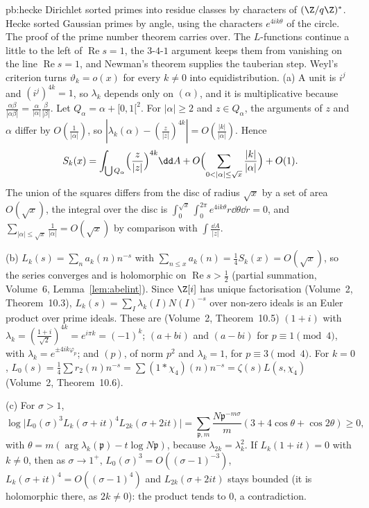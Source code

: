 \begin{solution}{pb:hecke}
\idea Dirichlet sorted primes into residue classes by characters of $(\Z/q\Z)^*$. Hecke sorted Gaussian primes by angle, using the characters $e^{4ik\theta}$ of the circle. The proof of the prime number theorem carries over. The $L$-functions continue a little to the left of $\operatorname{Re}s=1$, the $3$-$4$-$1$ argument keeps them from vanishing on the line $\operatorname{Re}s=1$, and Newman's theorem supplies the tauberian step. Weyl's criterion turns $\vartheta_k=o(x)$ for every $k\ne0$ into equidistribution.
\writeup (a) A unit is $i^j$ and $(i^j)^{4k}=1$, so $\lambda_k$ depends only on $(\alpha)$, and it is multiplicative because $\frac{\alpha\beta}{|\alpha\beta|}=\frac\alpha{|\alpha|}\frac\beta{|\beta|}$. Let $Q_\alpha=\alpha+[0,1[^2$.
For $|\alpha|\ge2$ and $z\in Q_\alpha$, the arguments of $z$ and $\alpha$ differ by $O(\frac1{|\alpha|})$, so $|\lambda_k(\alpha)-(\frac z{|z|})^{4k}|=O(\frac{|k|}{|\alpha|})$. Hence
\[
S_k(x)=\int_{\bigcup Q_\alpha}\Bigl(\frac z{|z|}\Bigr)^{4k}\dd A+O\Bigl(\sum_{0<|\alpha|\le\sqrt x}\frac{|k|}{|\alpha|}\Bigr)+O(1).
\]
The union of the squares differs from the disc of radius $\sqrt x$ by a set of area $O(\sqrt x)$, the integral over the disc is $\int_0^{\sqrt x}\int_0^{2\pi}e^{4ik\theta}r\dd\theta\dd r=0$,
and $\sum_{|\alpha|\le\sqrt x}\frac1{|\alpha|}=O(\sqrt x)$ by comparison with $\int\frac{\dd A}{|z|}$.

(b) $L_k(s)=\sum_na_k(n)n^{-s}$ with $\sum_{n\le x}a_k(n)=\frac14S_k(x)=O(\sqrt x)$, so the series converges and is holomorphic on $\operatorname{Re}s>\frac12$ (partial summation, Volume~6,
Lemma~\ref{lem:abelint}). Since $\Z[i]$ has unique factorisation (Volume~2, Theorem~10.3), $L_k(s)=\sum_I\lambda_k(I)N(I)^{-s}$ over non-zero ideals is an Euler product over prime ideals. These are
(Volume~2, Theorem~10.5) $(1+i)$ with $\lambda_k=(\frac{1+i}{\sqrt2})^{4k}=e^{i\pi k}=(-1)^k$; $(a+bi)$ and $(a-bi)$ for $p\equiv1\pmod4$, with $\lambda_k=e^{\pm4ik\varphi_p}$; and $(p)$, of norm
$p^2$ and $\lambda_k=1$, for $p\equiv3\pmod4$. For $k=0$, $L_0(s)=\frac14\sum r_2(n)n^{-s}=\sum(1*\chi_4)(n)n^{-s}=\zeta(s)L(s,\chi_4)$ (Volume~2, Theorem~10.6).

(c) For $\sigma>1$,
\[
\log\bigl|L_0(\sigma)^3L_k(\sigma+it)^4L_{2k}(\sigma+2it)\bigr|=\sum_{\mathfrak p,m}\frac{N\mathfrak p^{-m\sigma}}m(3+4\cos\theta+\cos2\theta)\ge0,
\]
with
$\theta=m(\arg\lambda_k(\mathfrak p)-t\log N\mathfrak p)$, because $\lambda_{2k}=\lambda_k^2$. If $L_k(1+it)=0$ with $k\ne0$, then as $\sigma\to1^+$, $L_0(\sigma)^3=O((\sigma-1)^{-3})$,
$L_k(\sigma+it)^4=O((\sigma-1)^4)$ and $L_{2k}(\sigma+2it)$ stays bounded (it is holomorphic there, as $2k\ne0$): the product tends to $0$, a contradiction.


\end{solution}
